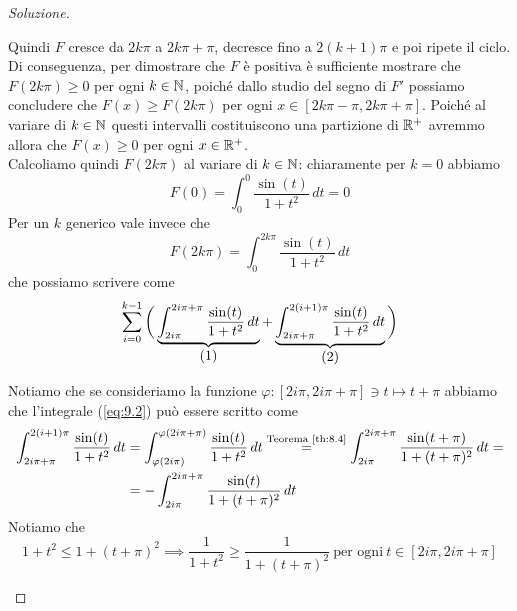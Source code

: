 \begin{proof}[Soluzione]
\begin{enumerate}[(i)]
\begin{center}
        \end{center}
        Quindi $F$ cresce da $2k\pi$ a $2k\pi + \pi$, decresce fino a $2(k+1)\pi$ e poi ripete il ciclo. Di conseguenza, per dimostrare che $F$ è positiva è sufficiente mostrare che $F(2k\pi)\ge 0$ per ogni $k\in\amsbb{N}$, poiché dallo studio del segno di $F'$ possiamo concludere che $F(x)\ge F(2k\pi)$ per ogni $x\in[2k\pi -\pi , 2k\pi +\pi]$. Poiché al variare di $k\in\amsbb{N}$ questi intervalli costituiscono una partizione di $\amsbb{R}^+$ avremmo allora che $F(x)\ge 0$ per ogni $x\in\amsbb{R}^+$.\\
        Calcoliamo quindi $F(2k\pi)$ al variare di $k\in\amsbb{N}$: chiaramente per $k=0$ abbiamo
        \[
        F(0) =  \int_0^0 \frac{\sin(t)}{1+t^2}\, dt = 0
        \]
        Per un $k$ generico vale invece che
        \[
        F(2k\pi) = \int_0^{2k\pi}\frac{\sin(t)}{1+t^2}\, dt
        \]
        che possiamo scrivere come
        \[
        \sum_{i=0}^{k-1}\bigg(\underbrace{\int_{2i\pi}^{2i\pi +\pi} \frac{\sin(t)}{1+t^2}\, dt}_{\stepcounter{equation}\mbox{(\theequation)}} + \underbrace{\int_{2i\pi + \pi }^{2(i+1)\pi} \frac{\sin(t)}{1+t^2}\, dt}_{\stepcounter{equation}\mbox{(\theequation)}}\bigg)
        \]
        \addtocounter{equation}{-2}\label{eq:9.1}
        \addtocounter{equation}{0}\label{eq:9.2}
        Notiamo che se consideriamo la funzione $\varphi\colon [2i\pi, 2i\pi + \pi]\ni t \mapsto t+\pi$ abbiamo che l'integrale (\ref{eq:9.2}) può essere scritto come
        \[
        \begin{split}
            \int_{2i\pi +\pi}^{2(i+1)\pi} \frac{\sin(t)}{1+t^2}\, dt &= \int_{\varphi(2i\pi)}^{\varphi(2i\pi +\pi)} \frac{\sin(t)}{1+t^2}\, dt \overset{\text{Teorema \ref{th:8.4}}}{=} \int_{2i\pi}^{2i\pi +\pi} \frac{\sin(t+\pi)}{1+(t+\pi)^2}\, dt = \\
            & = -\int_{2i\pi}^{2i\pi +\pi} \frac{\sin(t)}{1+(t+\pi)^2}\, dt
        \end{split}
        \]
        Notiamo che 
        \[
        1+t^2 \le 1+(t+\pi)^2 \implies \frac{1}{1+t^2}\ge \frac{1}{1+(t+\pi)^2} \ \text{per ogni} \ t\in[2i\pi, 2i\pi+\pi]
\]
\end{enumerate}
\end{proof}
